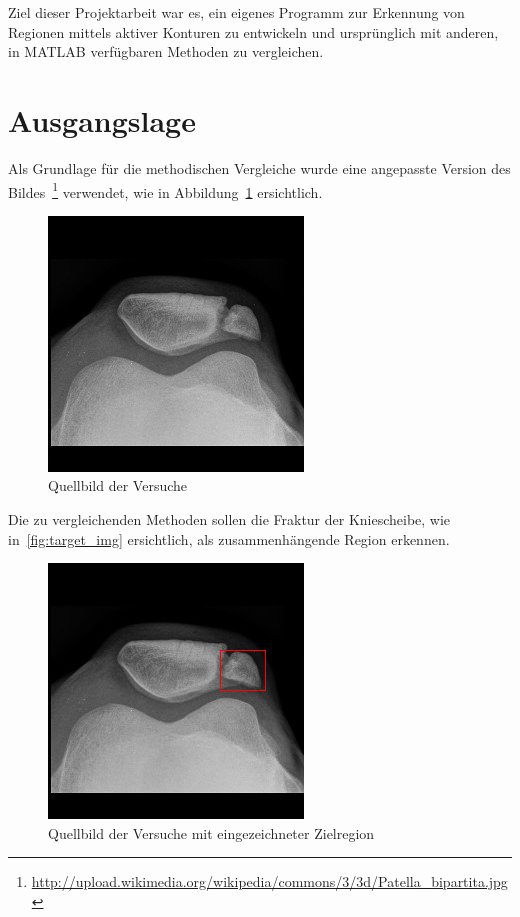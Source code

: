 Ziel dieser Projektarbeit war es, ein eigenes Programm zur Erkennung von Regionen mittels aktiver Konturen zu entwickeln und ursprünglich mit anderen, in MATLAB verfügbaren Methoden zu vergleichen.

\section{Ausgangslage}
\label{sec:proceeding:basics}
Als Grundlage für die methodischen Vergleiche wurde eine angepasste Version des Bildes~\footnote{\url{http://upload.wikimedia.org/wikipedia/commons/3/3d/Patella_bipartita.jpg}} verwendet, wie in Abbildung~\ref{fig:source_img} ersichtlich.

\begin{figure}[h!]
    \centering
    \includegraphics[scale=0.5]{images/patella_bipartita.jpg}
    \caption{Quellbild der Versuche\protect\footnotemark[2]{}}
\label{fig:source_img}
\end{figure}

Die zu vergleichenden Methoden sollen die Fraktur der Kniescheibe, wie in~\autoref{fig:target_img} ersichtlich, als zusammenhängende Region erkennen.

\begin{figure}[h!]
    \centering
    \includegraphics[scale=0.5]{images/patella_bipartita_target.jpg}
    \caption{Quellbild der Versuche mit eingezeichneter Zielregion\protect\footnotemark[2]{}}
\label{fig:target_img}
\end{figure}

